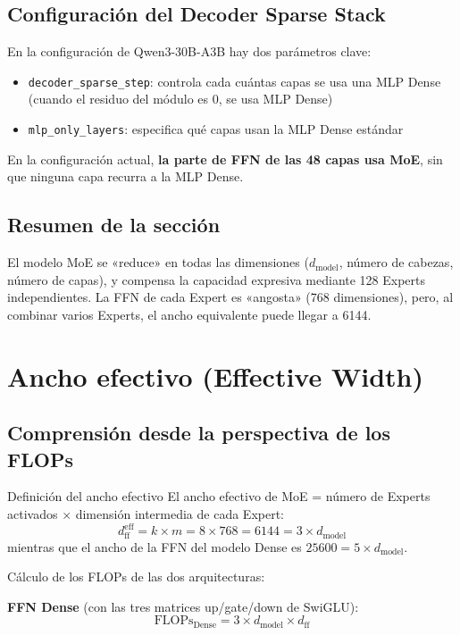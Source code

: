 \documentclass[a4paper]{article}
\begin{document}
\subsection{Configuración del Decoder Sparse Stack}

En la configuración de Qwen3-30B-A3B hay dos parámetros clave:
\begin{itemize}
  \item \texttt{decoder\_sparse\_step}: controla cada cuántas capas se usa una MLP Dense (cuando el residuo del módulo es 0, se usa MLP Dense)
  \item \texttt{mlp\_only\_layers}: especifica qué capas usan la MLP Dense estándar
\end{itemize}

En la configuración actual, \textbf{la parte de FFN de las 48 capas usa MoE}, sin que ninguna capa recurra a la MLP Dense.

\subsection{Resumen de la sección}

El modelo MoE se «reduce» en todas las dimensiones ($d_{\text{model}}$, número de cabezas, número de capas), y compensa la capacidad expresiva mediante 128 Experts independientes. La FFN de cada Expert es «angosta» (768 dimensiones), pero, al combinar varios Experts, el ancho equivalente puede llegar a 6144.

\section{Ancho efectivo (Effective Width)}

\subsection{Comprensión desde la perspectiva de los FLOPs}

\begin{importantbox}{Definición del ancho efectivo}
El ancho efectivo de MoE = número de Experts activados $\times$ dimensión intermedia de cada Expert:
$$
d_{\text{ff}}^{\text{eff}} = k \times m = 8 \times 768 = 6144 = 3 \times d_{\text{model}}
$$
mientras que el ancho de la FFN del modelo Dense es $25600 = 5 \times d_{\text{model}}$.
\end{importantbox}

Cálculo de los FLOPs de las dos arquitecturas:

\textbf{FFN Dense} (con las tres matrices up/gate/down de SwiGLU):
$$
\text{FLOPs}_{\text{Dense}} = 3 \times d_{\text{model}} \times d_{\text{ff}}
$$
\end{document}
